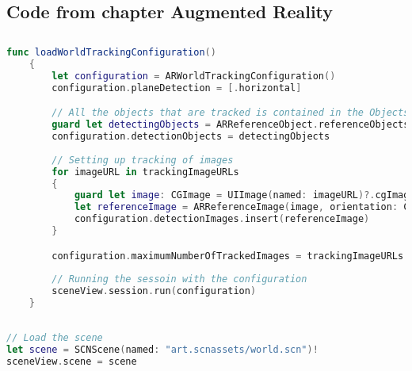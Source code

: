 \newpage

\begin{appendices}
\chapter{Code from chapter Augmented Reality}
\section{}
\begin{lstlisting}[language=swift]
func loadWorldTrackingConfiguration()
    {
        let configuration = ARWorldTrackingConfiguration()
        configuration.planeDetection = [.horizontal]

        // All the objects that are tracked is contained in the Objects folder
        guard let detectingObjects = ARReferenceObject.referenceObjects(inGroupNamed: "Objects", bundle: nil) else { return }
        configuration.detectionObjects = detectingObjects
        
        // Setting up tracking of images
        for imageURL in trackingImageURLs
        {
            guard let image: CGImage = UIImage(named: imageURL)?.cgImage else { return }
            let referenceImage = ARReferenceImage(image, orientation: CGImagePropertyOrientation.up, physicalWidth: 0.3)
            configuration.detectionImages.insert(referenceImage)
        }

        configuration.maximumNumberOfTrackedImages = trackingImageURLs.count
        
        // Running the sessoin with the configuration
        sceneView.session.run(configuration)
    }
\end{lstlisting}

\section{}
\begin{lstlisting}[language=swift]
// Load the scene
let scene = SCNScene(named: "art.scnassets/world.scn")!        
sceneView.scene = scene
\end{lstlisting}

\section{}


\end{appendices}
